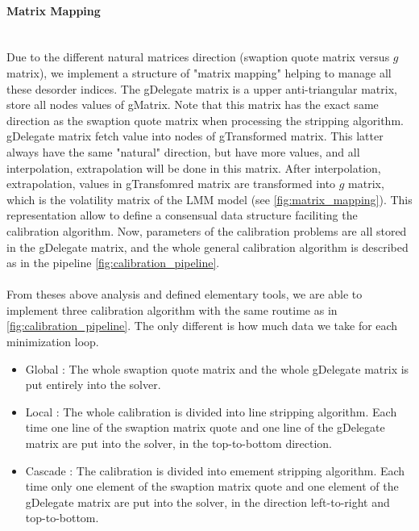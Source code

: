 \documentclass[a4paper,10pt]{article}
\begin{document}
\paragraph{Matrix Mapping}\mbox{} \\
Due to the different natural matrices direction (swaption quote matrix versus $g$ matrix), we implement a structure of "matrix mapping" helping to manage all these desorder indices. The gDelegate matrix is a upper anti-triangular matrix, store all nodes values of gMatrix. Note that this matrix has the exact same direction as the swaption quote matrix when processing the stripping algorithm. gDelegate matrix fetch value into nodes of gTransformed matrix. This latter always have the same "natural" direction, but have more values, and all interpolation, extrapolation will be done in this matrix. After interpolation, extrapolation, values in gTransfomred matrix are transformed into $g$ matrix, which is the volatility matrix of the LMM model (see \ref{fig:matrix_mapping}). This representation allow to define a consensual data structure faciliting the calibration algorithm. Now, parameters of the calibration problems are all stored in the gDelegate matrix, and the whole general calibration algorithm is described as in the pipeline \ref{fig:calibration_pipeline}.

\paragraph{} From theses above analysis and defined elementary tools, we are able to implement three calibration algorithm with the same routime as in \ref{fig:calibration_pipeline}. The only different is how much data we  take for each minimization loop.
\begin{itemize}
 \item Global : The whole swaption quote matrix and the whole gDelegate matrix is put entirely into the solver.
 \item Local : The whole calibration is divided into line stripping algorithm. Each time one line of the swaption matrix quote and one line of the gDelegate matrix are put into the solver, in the top-to-bottom direction.
 \item Cascade : The calibration is divided into emement stripping algorithm. Each time only one element of the swaption matrix quote and one element of the gDelegate matrix are put into the solver, in the direction left-to-right and top-to-bottom.
\end{itemize}
\end{document}
